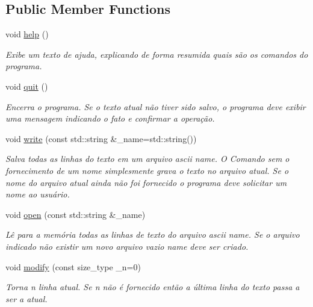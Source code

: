 \subsection*{Public Member Functions}
\begin{DoxyCompactItemize}
\item 
\mbox{\label{classelis_ab0982ac8d4cf72566aab79a002559831}} 
void \hyperlink{classelis_ab0982ac8d4cf72566aab79a002559831}{help} ()
\begin{DoxyCompactList}\small\item\em Exibe um texto de ajuda, explicando de forma resumida quais são os comandos do programa. \end{DoxyCompactList}\item 
\mbox{\label{classelis_a0a743df9141cb61978d1739b3654409b}} 
void \hyperlink{classelis_a0a743df9141cb61978d1739b3654409b}{quit} ()
\begin{DoxyCompactList}\small\item\em Encerra o programa. Se o texto atual não tiver sido salvo, o programa deve exibir uma mensagem indicando o fato e confirmar a operação. \end{DoxyCompactList}\item 
void \hyperlink{classelis_a92ba8d201559a28f3592ab340311e108}{write} (const std\+::string \&\+\_\+name=std\+::string())
\begin{DoxyCompactList}\small\item\em Salva todas as linhas do texto em um arquivo ascii name. O Comando sem o fornecimento de um nome simplesmente grava o texto no arquivo atual. Se o nome do arquivo atual ainda não foi fornecido o programa deve solicitar um nome ao usuário. \end{DoxyCompactList}\item 
void \hyperlink{classelis_a23ea13aa06bd599d37b2b8f7fd8a5bf9}{open} (const std\+::string \&\+\_\+name)
\begin{DoxyCompactList}\small\item\em Lê para a memória todas as linhas de texto do arquivo ascii name. Se o arquivo indicado não existir um novo arquivo vazio name deve ser criado. \end{DoxyCompactList}\item 
void \hyperlink{classelis_a863421e1b739bbaa727da3ec66333248}{modify} (const size\+\_\+type \+\_\+n=0)
\begin{DoxyCompactList}\small\item\em Torna n linha atual. Se n não é fornecido então a última linha do texto passa a ser a atual. \end{DoxyCompactList}\item 

\end{DoxyCompactItemize}
